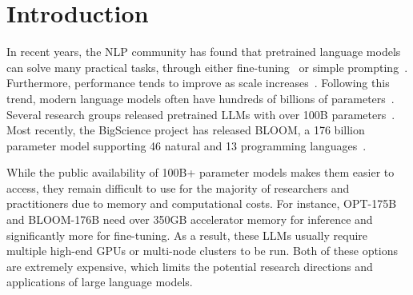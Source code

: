 \section{Introduction}


In recent years, the NLP community has found that pretrained language models can solve many practical tasks, through either fine-tuning~\cite{gpt} or simple prompting~\cite{gpt3}. Furthermore, performance tends to improve as scale increases~\cite{gpt2, kaplan2020scaling}. Following this trend, modern language models often have hundreds of billions of parameters~\cite{gpt3,gopher,pangua,hyperclova}\nocite{switch,jurrasic,Lepikhin2020GShardSG,glam}. Several research groups released pretrained LLMs with over 100B parameters~\cite{opt,yalm,zeng2020glm}\nocite{gpt,gpt-neox-20bj}. Most recently, the BigScience project has released BLOOM, a 176 billion parameter model supporting 46 natural and 13 programming languages~\cite{bloom}.


While the public availability of 100B+ parameter models makes them easier to access, they remain difficult to use for the majority of researchers and practitioners due to memory and computational costs. For instance, OPT-175B and BLOOM-176B need over 350GB accelerator memory for inference and significantly more for fine-tuning. As a result, these LLMs usually require multiple high-end GPUs or multi-node clusters\nocite{megatron2} to be run. Both of these options are extremely expensive, which limits the potential research directions and applications of large language models.


